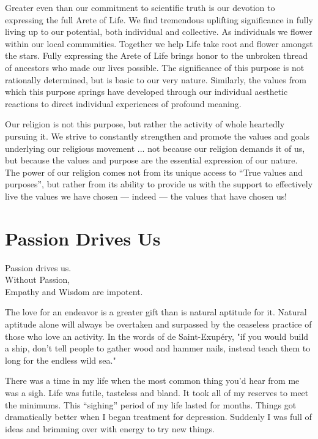 \documentclass[ebook,12pt,openany,twoside]{memoir}
\newcommand{\tab}{\hspace*{2em}}
\newcommand{\imagefacingchapter}[1]{
  \cleartoverso
  \clearpage \null
  \thispagestyle{cleared}
  \AddToShipoutPictureBG*{%
    \AtStockLowerLeft{%
      \texttt{[image: \#1]}
    }
  }
  \clearpage
}
\begin{document}
Greater even than our commitment to scientific truth is our devotion to expressing the full Arete of Life. We find tremendous uplifting significance in fully living up to our
potential, both individual and collective. As individuals we flower within our
local communities. Together we help Life take root and flower amongst the
stars. Fully expressing the Arete of Life brings honor to the unbroken thread
of ancestors who made our lives possible. The significance of this purpose is not rationally determined, but is basic to
our very nature. Similarly, the values from which this purpose springs have developed through our individual aesthetic reactions to direct individual experiences of profound meaning.

Our religion is not this purpose, but rather the activity of whole heartedly pursuing it. We strive to constantly
strengthen and promote the values and goals underlying our religious movement
... not because our religion demands it of us, but because the values and
purpose are the essential expression of our nature. The power of our religion comes not from its unique access to ``True values and
purposes'', but rather from its ability to provide us with the support to
effectively live the values we have chosen --- indeed --- the values that
have chosen us!



\imagefacingchapter{images/Elephant}
\chapter{Passion Drives Us}
\setlength\epigraphwidth{2.8in}
\epigraph{
  Passion drives us.\\
  Without Passion,\\
  \tab Empathy and Wisdom are impotent.
}{}

\noindent The love for an endeavor is a greater gift than is natural aptitude for it.
Natural aptitude alone will always be overtaken and surpassed by the ceaseless
practice of those who love an activity. In the words of de Saint-Exup\'{e}ry,
"if you would build a ship, don't tell people to gather wood and hammer nails,
instead teach them to long for the endless wild sea."

There was a time in my life when the most common thing you'd hear
from me was a sigh. Life was futile, tasteless and bland. It took all of my
reserves to meet the minimums. This ``sighing'' period of my life lasted for
months. Things got dramatically better when I began treatment for depression.
Suddenly I was full of ideas and brimming over with energy to try new things.
\end{document}
